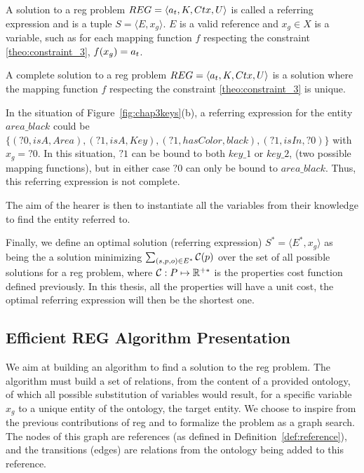 \documentclass[a4paper,11pt,twoside]{StyleThese}
\begin{document}
\begin{definition}
\label{def:re}
A solution to a \acrshort{reg} problem $REG = \langle a_t, K, Ctx, U \rangle$ is called a referring expression and is a tuple $S = \langle E, x_g \rangle$. $E$ is a valid reference and $x_g \in X$ is a variable, such as for each mapping function $f$ respecting the constraint \ref{theo:constraint_3}, $f(x_g) = a_t$.
\end{definition}

\begin{definition}
\label{def:complete_re}
A complete solution to a \acrshort{reg} problem $REG = \langle a_t, K, Ctx, U \rangle$ is a solution where the mapping function $f$ respecting the constraint \ref{theo:constraint_3} is unique.
\end{definition}

In the situation of Figure~\ref{fig:chap3keys}(b), a referring expression for the entity $area\_black$ could be $\{(?0, isA, Area), (?1, isA, Key), (?1, hasColor, black), (?1, isIn, ?0)\}$ with $x_g = ?0$. In this situation, $?1$ can be bound to both $key\_1$ or $key\_2$, (two possible mapping functions), but in either case $?0$ can only be bound to $area\_black$. Thus, this referring expression is not complete.

The aim of the hearer is then to instantiate all the variables from their knowledge to find the entity referred to.

Finally, we define an optimal solution (referring expression) $S^* = \langle E^*, x_g \rangle$ as being the a solution minimizing $\sum_{(s, p, o) \in E^*}\mathcal{C}(p)$ over the set of all possible solutions for a \acrshort{reg} problem, where $\mathcal{C}: P \mapsto \mathbb{R}^{+*}$ is the properties cost function defined previously. In this thesis, all the properties will have a unit cost, the optimal referring expression will then be the shortest one.


\subsection{Efficient REG Algorithm Presentation}
We aim at building an algorithm to find a solution to the \acrshort{reg} problem. The algorithm must build a set of relations, from the content of a provided ontology, of which all possible substitution of variables would result, for a specific variable $x_g$ to a unique entity of the ontology, the target entity. We choose to inspire from the previous contributions of \acrshort{reg} and to formalize the problem as a graph search. The nodes of this graph are references (as defined in Definition~\ref{def:reference}), and the transitions (edges) are relations from the ontology being added to this reference.
\end{document}

